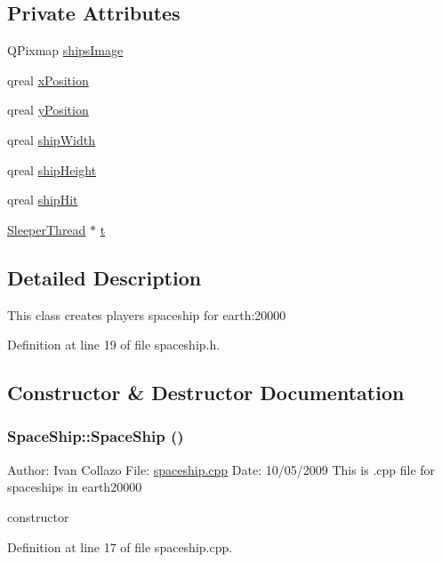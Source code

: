 \subsection*{Private Attributes}
\begin{DoxyCompactItemize}
\item 
QPixmap \hyperlink{class_space_ship_a5bdb581da7eafb13095e97666ebe83bc}{shipsImage}
\item 
qreal \hyperlink{class_space_ship_a4f960ec3383ec268c7db8c97b97a5c7d}{xPosition}
\item 
qreal \hyperlink{class_space_ship_a01360fa6f81ff5c448d68142293f578b}{yPosition}
\item 
qreal \hyperlink{class_space_ship_a842854c644480d337e52fa125a838cce}{shipWidth}
\item 
qreal \hyperlink{class_space_ship_a344d1e5b92d9286103aef6e1c27f0a76}{shipHeight}
\item 
qreal \hyperlink{class_space_ship_a53bc0fb5aa0a9b0c0d7fc70a76e1feda}{shipHit}
\item 
\hyperlink{class_sleeper_thread}{SleeperThread} $\ast$ \hyperlink{class_space_ship_aa415fbdaccd76864a11592e738cf0348}{t}
\end{DoxyCompactItemize}


\subsection{Detailed Description}
This class creates players spaceship for earth:20000 

Definition at line 19 of file spaceship.h.

\subsection{Constructor \& Destructor Documentation}
\hypertarget{class_space_ship_ae56e545157e761155089250245ad3455}{
\subsubsection[{SpaceShip}]{\setlength{\rightskip}{0pt plus 5cm}SpaceShip::SpaceShip ()}}
\label{class_space_ship_ae56e545157e761155089250245ad3455}
Author: Ivan Collazo File: \hyperlink{spaceship_8cpp}{spaceship.cpp} Date: 10/05/2009 This is .cpp file for spaceships in earth20000

constructor 

Definition at line 17 of file spaceship.cpp.


